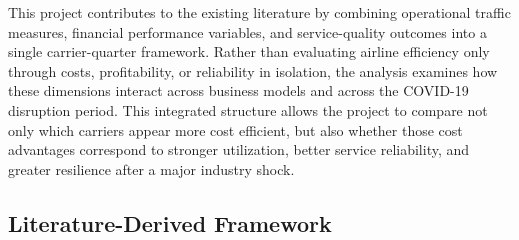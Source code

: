 \documentclass[11pt, letterpaper]{article}
\begin{document}
\indent This project contributes to the existing literature by combining operational traffic measures, financial performance variables, and service-quality outcomes into a single carrier-quarter framework. Rather than evaluating airline efficiency only through costs, profitability, or reliability in isolation, the analysis examines how these dimensions interact across business models and across the COVID-19 disruption period. This integrated structure allows the project to compare not only which carriers appear more cost efficient, but also whether those cost advantages correspond to stronger utilization, better service reliability, and greater resilience after a major industry shock.

\subsection{Literature-Derived Framework}
\end{document}
